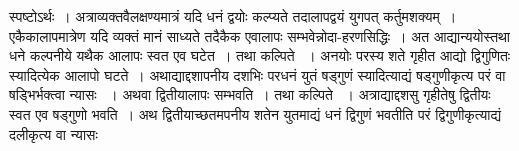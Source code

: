 \documentclass[11pt, openany]{book}
\begin{document}
\begin{sloppypar}
स्पष्टोऽर्थः~। अत्राव्यक्तवैलक्षण्यमात्रं यदि धनं द्वयोः कल्प्यते तदालापद्वयं युगपत् कर्तुमशक्यम्~। एकैकालापमात्रेण यदि व्यक्तं मानं साध्यते तदैकैक एवालापः सम्भवेन्नोदा-हरणसिद्धिः~। अत आद्यान्ययोस्तथा धने कल्पनीये यथैक आलापः स्वत एव घटेत~। तथा कल्पिते ~। अनयोः परस्य शते गृहीत आद्यो द्विगुणितः स्यादित्येक आलापो घटते~। अथाद्याद्दशापनीय दशभिः परधनं युतं षड्गुणं स्यादित्याद्यं षड्गुणीकृत्य परं वा षड्भिर्भक्त्वा न्यासः ~। अथवा द्वितीयालापः सम्भवति~। तथा कल्पिते ~। अत्राद्याद्दशसु गृहीतेषु द्वितीयः स्वत एव षड्गुणो भवति~। अथ द्वितीयाच्छतमपनीय शतेन युतमाद्यं धनं द्विगुणं भवतीति परं द्विगुणीकृत्याद्यं दलीकृत्य वा न्यासः 

\end{sloppypar}
\end{document}
